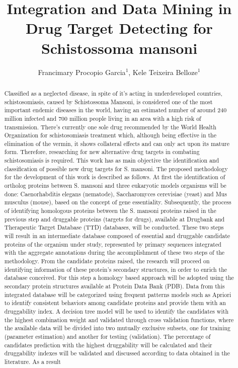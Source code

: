 \documentclass[twoside]{article}
\title{\vspace{-15mm}\fontsize{24pt}{10pt}\selectfont\textbf{Integration and Data Mining in Drug Target Detecting for Schistossoma mansoni}} %
\author{Francimary Procopio Garcia$^1$, Kele Teixeira Belloze$^1$}
\affil{1 CEFET/RJ\\ }
\date{}
\begin{document}
\maketitle %

\thispagestyle{fancy} %


\begin{abstract}
Classified as a neglected disease, in spite of it's acting in underdeveloped countries, schistosomiasis, caused by Schistossoma Mansoni, is considered one of the most important endemic diseases in the world, having an estimated number of around 240 million infected and 700 million people living in an area with a high risk of transmission. There's currently one sole drug recommended by the World Health Organization for schistosomiasis treatment which, although being effective in the elimination of the vermin, it shows collateral effects and can only act upon its mature form. Therefore, researching for new alternative drug targets in combating schistosomiasis is required. This work has as main objective the identification and classification of possible new drug targets for S. mansoni. The proposed methodology for the development of this work is described as follows.  At first the identification of ortholog proteins between S. mansoni and three eukaryotic models organisms will be done: Caenorhabditis elegans (nematode), Saccharomyces cerevisiae (yeast) and Mus musculus (mouse), based on the concept of gene essentiality. Subsequently, the process of identifying homologous proteins between the S. mansoni proteins raised in the previous step and druggable proteins (targets for drugs), available at Drugbank and Therapeutic Target Database (TTD) databases, will be conducted. These two steps will result in an intermediate database composed of essential and druggable candidate proteins of the organism under study, represented by primary sequences integrated with the aggregate annotations during the accomplishment of these two steps of the methodology. From the candidate proteins raised, the research will proceed on identifying information of these protein's secondary structures, in order to enrich the database conceived. For this step a homology based approach will be adopted using the secondary protein structures available at Protein Data Bank (PDB). Data from this integrated database will be categorized using frequent patterns models such as Apriori to identify consistent behaviors among candidate proteins and provide them with an druggability index. A decision tree model will be used to identify the candidates with the highest combination weight and validated through cross validation functions, where the available data will be divided into two mutually exclusive subsets, one for training (parameter estimation) and another for testing (validation). The percentage of candidates prediction with the highest druggability will be calculated and their druggability indexes will be validated and discussed according to data obtained in the literature. As a result 
\end{abstract}
\end{document}
